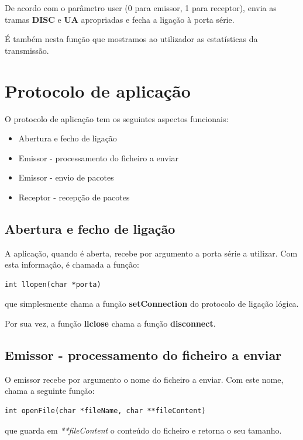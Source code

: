 \documentclass[a4paper,11pt]{article}
\begin{document}
De acordo com o parâmetro user (0 para emissor, 1 para receptor), envia as tramas \textbf{DISC} e \textbf{UA} apropriadas e fecha a ligação à porta série.

É também nesta função que mostramos ao utilizador as estatísticas da transmissão.

\section{Protocolo de aplicação}

O protocolo de aplicação tem os seguintes aspectos funcionais:

\begin{itemize}
  \item Abertura e fecho de ligação
  \item Emissor - processamento do ficheiro a enviar
  \item Emissor - envio de pacotes
  \item Receptor - recepção de pacotes
\end{itemize}

\subsection{Abertura e fecho de ligação}

A aplicação, quando é aberta, recebe por argumento a porta série a utilizar. Com esta informação, é chamada a função:

\begin{lstlisting}
int llopen(char *porta)
\end{lstlisting}

que simplesmente chama a função \textbf{setConnection} do protocolo de ligação lógica.

Por sua vez, a função \textbf{llclose} chama a função \textbf{disconnect}.

\subsection{Emissor - processamento do ficheiro a enviar}

O emissor recebe por argumento o nome do ficheiro a enviar. Com este nome, chama a seguinte função:

\begin{lstlisting}
int openFile(char *fileName, char **fileContent)
\end{lstlisting}

que guarda em \textit{**fileContent} o conteúdo do ficheiro e retorna o seu tamanho.
\end{document}
